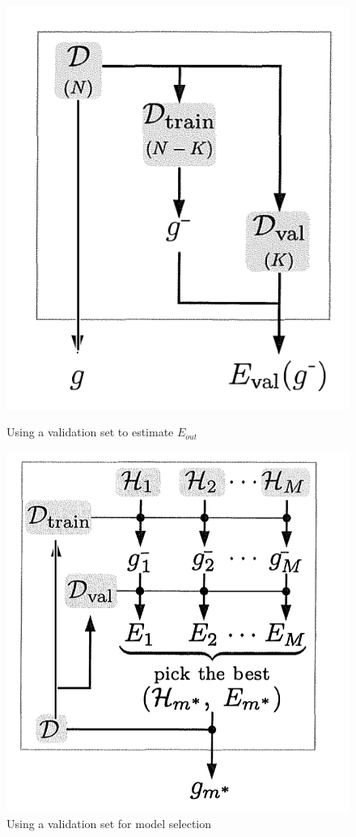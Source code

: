 \documentclass[10pt]{article}
\begin{document}
\begin{figure}[!htb]
   \begin{minipage}{0.48\textwidth}
     \centering
     \includegraphics[width=.7\linewidth]{figure/fig0.png}
     \caption{Using a validation set to estimate $E_{out}$}
     \label{fig:problem0}
   \end{minipage}\hfill
   \begin{minipage}{0.48\textwidth}
     \centering
     \includegraphics[width=.8\linewidth]{figure/modelSelection.png}
     \caption{Using a validation set for model selection}
     \label{Fig:modelselection2}
   \end{minipage}
\end{figure}
\end{document}
